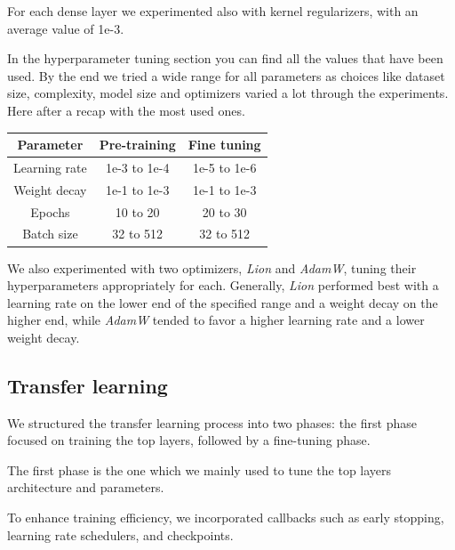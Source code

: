 \documentclass[11pt]{article}
\begin{document}
\begin{multicols}{2}
        For each dense layer we experimented also with kernel regularizers, with an average value of 1e-3.
        
        In the hyperparameter tuning section you can find all the values that have been used. By the end we tried a wide range for all parameters as choices like dataset size, complexity, model size and optimizers varied a lot through the experiments.
        Here after a recap with the most used ones.
        
        \begin{table}[H]
            \centering
            \setlength{\tabcolsep}{5pt}
            \begin{tabular}{|c|c|c|}
                \hline
                \textbf{Parameter} & \textbf{Pre-training} & \textbf{Fine tuning} \\ \hline
                Learning rate & 1e-3 to 1e-4 & 1e-5 to 1e-6 \\ \hline
                Weight decay & 1e-1 to 1e-3 & 1e-1 to 1e-3 \\ \hline
                Epochs & 10 to 20 & 20 to 30 \\ \hline
                Batch size & 32 to 512 & 32 to 512 \\ \hline
            \end{tabular}
        \end{table}
        
        We also experimented with two optimizers, \textit{Lion} and \textit{AdamW}, tuning their hyperparameters appropriately for each. Generally, \textit{Lion} performed best with a learning rate on the lower end of the specified range and a weight decay on the higher end, while \textit{AdamW} tended to favor a higher learning rate and a lower weight decay.
        
        \subsection{Transfer learning}
        
        We structured the transfer learning process into two phases: the first phase focused on training the top layers, followed by a fine-tuning phase.
        
        The first phase is the one which we mainly used to tune the top layers architecture and parameters.
        
        To enhance training efficiency, we incorporated callbacks such as early stopping, learning rate schedulers, and checkpoints.
        

\end{multicols}
\end{document}
